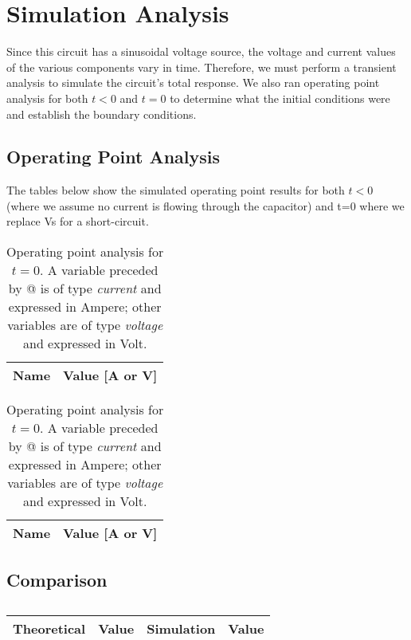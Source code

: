 \newpage
\section{Simulation Analysis}
\label{sec:simulation}
Since this circuit has a sinusoidal voltage source, the voltage and current values of the various components vary in time. Therefore, we must perform a transient analysis to simulate the circuit's total response. We also ran operating point analysis for both $t<0$ and $t=0$ to determine what the initial conditions were and establish the boundary conditions.
\subsection{Operating Point Analysis}
The tables below show the simulated operating point results for both $t<0$ (where we assume no current is flowing through the capacitor) and t=0 where we replace Vs for a short-circuit.
\begin{table}[!htb]
	\begin{minipage}{.5\linewidth}
	\centering
	\begin{tabular}{ll}
	{\bf Name} & {\bf Value [A or V]} \\ \hline
	
	\end{tabular}
	\caption{Operating point analysis for $t<0$. A variable preceded by @ is of type {\em current} other variables are of type {\it voltage} and expressed in Volt.}
  	\end{minipage}
  	\hfill
	\begin{minipage}{.5\linewidth}
	\centering
  	\begin{tabular}{ll}
   	{\bf Name} & {\bf Value [A or V]} \\ \hline
   	
	\end{tabular}
	\caption{Operating point analysis for $t=0$. A variable preceded by @ is of type {\em current} and expressed in Ampere; other variables are of type {\it voltage} and expressed in Volt.}
	\end{minipage}
\end{table}
\newpage
\subsection{Comparison}
\begin{table}[!h]
  \centering
  \begin{tabular}{c c c c}
    \hline    
    {\bf Theoretical} & {\bf Value} & {\bf Simulation} & {\bf Value}\\ \hline
     
  \end{tabular}
  \caption{}
  \label{tab:nule}
\end{table}
\newpage
